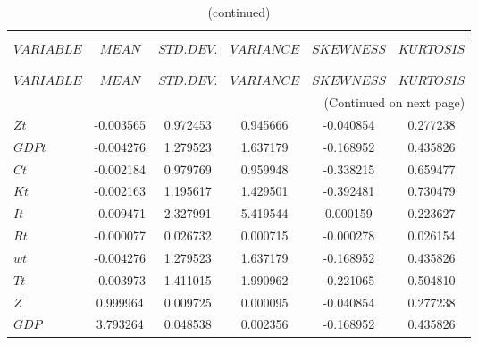  
\begin{center}
\begin{longtable}{lccccc} 
\caption{MOMENTS OF SIMULATED VARIABLES}\\
 \label{Table:sim_moments}\\
\toprule 
$VARIABLE  $	 & 	 $            MEAN$	 & 	 $       STD. DEV.$	 & 	 $        VARIANCE$	 & 	 $        SKEWNESS$	 & 	 $        KURTOSIS$\\
\midrule \endfirsthead 
\caption{(continued)}\\
 \toprule \\ 
$VARIABLE  $	 & 	 $            MEAN$	 & 	 $       STD. DEV.$	 & 	 $        VARIANCE$	 & 	 $        SKEWNESS$	 & 	 $        KURTOSIS$\\
\midrule \endhead 
\midrule \multicolumn{6}{r}{(Continued on next page)} \\ \bottomrule \endfoot 
\bottomrule \endlastfoot 
$Zt        $	 & 	       -0.003565	 & 	        0.972453	 & 	        0.945666	 & 	       -0.040854	 & 	        0.277238 \\ 
$GDPt      $	 & 	       -0.004276	 & 	        1.279523	 & 	        1.637179	 & 	       -0.168952	 & 	        0.435826 \\ 
$Ct        $	 & 	       -0.002184	 & 	        0.979769	 & 	        0.959948	 & 	       -0.338215	 & 	        0.659477 \\ 
$Kt        $	 & 	       -0.002163	 & 	        1.195617	 & 	        1.429501	 & 	       -0.392481	 & 	        0.730479 \\ 
$It        $	 & 	       -0.009471	 & 	        2.327991	 & 	        5.419544	 & 	        0.000159	 & 	        0.223627 \\ 
$Rt        $	 & 	       -0.000077	 & 	        0.026732	 & 	        0.000715	 & 	       -0.000278	 & 	        0.026154 \\ 
$wt        $	 & 	       -0.004276	 & 	        1.279523	 & 	        1.637179	 & 	       -0.168952	 & 	        0.435826 \\ 
$Tt        $	 & 	       -0.003973	 & 	        1.411015	 & 	        1.990962	 & 	       -0.221065	 & 	        0.504810 \\ 
$Z         $	 & 	        0.999964	 & 	        0.009725	 & 	        0.000095	 & 	       -0.040854	 & 	        0.277238 \\ 
$GDP       $	 & 	        3.793264	 & 	        0.048538	 & 	        0.002356	 & 	       -0.168952	 & 	        0.435826 \\ 

\end{longtable}
\end{center}
